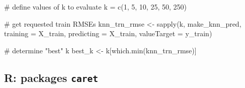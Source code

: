 \documentclass[
  letterpaper,
  DIV=11,
  numbers=noendperiod]{scrartcl}
\newenvironment{Shaded}{\begin{snugshade}}{\end{snugshade}}
\newcommand{\AttributeTok}[1]{\textcolor[rgb]{0.40,0.45,0.13}{#1}}
\newcommand{\CommentTok}[1]{\textcolor[rgb]{0.37,0.37,0.37}{#1}}
\newcommand{\DecValTok}[1]{\textcolor[rgb]{0.68,0.00,0.00}{#1}}
\newcommand{\FunctionTok}[1]{\textcolor[rgb]{0.28,0.35,0.67}{#1}}
\newcommand{\NormalTok}[1]{\textcolor[rgb]{0.00,0.23,0.31}{#1}}
\newcommand{\OtherTok}[1]{\textcolor[rgb]{0.00,0.23,0.31}{#1}}
\begin{document}
\begin{Shaded}
\begin{Highlighting}[]
\CommentTok{\# define values of k to evaluate}
\NormalTok{k }\OtherTok{=} \FunctionTok{c}\NormalTok{(}\DecValTok{1}\NormalTok{, }\DecValTok{5}\NormalTok{, }\DecValTok{10}\NormalTok{, }\DecValTok{25}\NormalTok{, }\DecValTok{50}\NormalTok{, }\DecValTok{250}\NormalTok{)}

\CommentTok{\# get requested train RMSEs}
\NormalTok{knn\_trn\_rmse }\OtherTok{\textless{}{-}} \FunctionTok{sapply}\NormalTok{(k, make\_knn\_pred, }\AttributeTok{training =}\NormalTok{ X\_train, }
                      \AttributeTok{predicting =}\NormalTok{ X\_train, }
                      \AttributeTok{valueTarget =}\NormalTok{ y\_train)}

\CommentTok{\# determine "best" k}
\NormalTok{best\_k }\OtherTok{\textless{}{-}}\NormalTok{ k[}\FunctionTok{which.min}\NormalTok{(knn\_trn\_rmse)]}
\end{Highlighting}
\end{Shaded}

\subsection{\texorpdfstring{R: packages
\texttt{caret}}{R: packages caret}}
\end{document}
